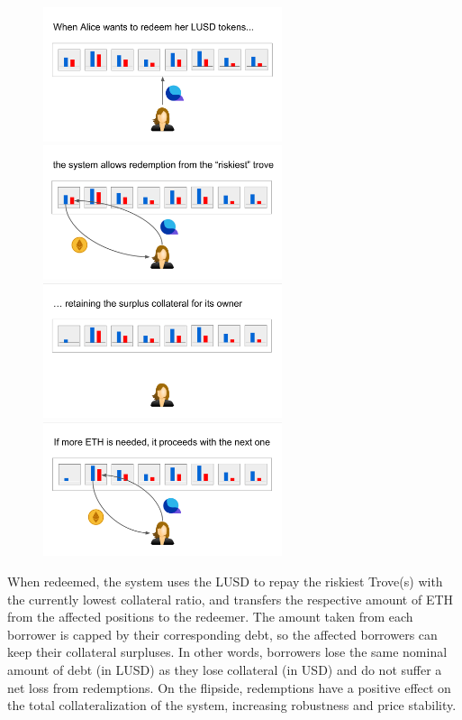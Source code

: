 \documentclass{article}
\begin{document}
\begin{figure}[h]
\centering
\includegraphics[width=7cm]{a1.png}
\includegraphics[width=7cm]{a2.png}
\includegraphics[width=7cm]{a3.png}
\includegraphics[width=7cm]{a4.png}
\end{figure}

When redeemed, the system uses the LUSD to repay the riskiest Trove(s) with the currently lowest collateral ratio, and transfers the respective amount of ETH from the affected positions to the redeemer. The amount taken from each borrower is capped by their corresponding debt, so the affected borrowers can keep their collateral surpluses. In other words, borrowers lose the same nominal amount of debt (in LUSD) as they lose collateral (in USD) and do not suffer a net loss from redemptions. On the flipside, redemptions have a positive effect on the total collateralization of the system, increasing robustness and price stability.
\end{document}
